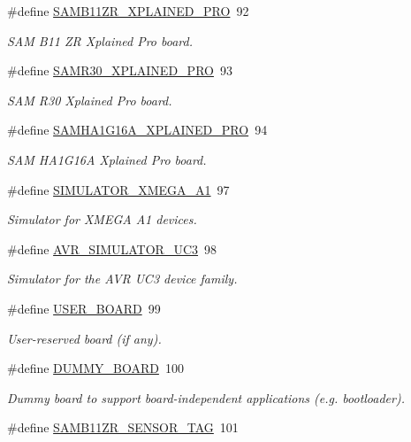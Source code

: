 \begin{DoxyCompactItemize}
\#define \mbox{\hyperlink{group__group__common__boards_ga2d39842a107a4167ecb83defbf24e7c2}{S\+A\+M\+B11\+Z\+R\+\_\+\+X\+P\+L\+A\+I\+N\+E\+D\+\_\+\+P\+RO}}~92
\begin{DoxyCompactList}\small\item\em S\+AM B11 ZR Xplained Pro board. \end{DoxyCompactList}\item 
\#define \mbox{\hyperlink{group__group__common__boards_ga2b7f84db63d05656cea0ad59e796c108}{S\+A\+M\+R30\+\_\+\+X\+P\+L\+A\+I\+N\+E\+D\+\_\+\+P\+RO}}~93
\begin{DoxyCompactList}\small\item\em S\+AM R30 Xplained Pro board. \end{DoxyCompactList}\item 
\#define \mbox{\hyperlink{group__group__common__boards_ga0752b49586742861982f51843b2ac76b}{S\+A\+M\+H\+A1\+G16\+A\+\_\+\+X\+P\+L\+A\+I\+N\+E\+D\+\_\+\+P\+RO}}~94
\begin{DoxyCompactList}\small\item\em S\+AM H\+A1\+G16A Xplained Pro board. \end{DoxyCompactList}\item 
\#define \mbox{\hyperlink{group__group__common__boards_ga1c9dfe8403ed817c13fc6031956b1635}{S\+I\+M\+U\+L\+A\+T\+O\+R\+\_\+\+X\+M\+E\+G\+A\+\_\+\+A1}}~97
\begin{DoxyCompactList}\small\item\em Simulator for X\+M\+E\+GA A1 devices. \end{DoxyCompactList}\item 
\#define \mbox{\hyperlink{group__group__common__boards_gad93cf08d9dfb95c3c2cfd1cf38c0f2e4}{A\+V\+R\+\_\+\+S\+I\+M\+U\+L\+A\+T\+O\+R\+\_\+\+U\+C3}}~98
\begin{DoxyCompactList}\small\item\em Simulator for the A\+VR U\+C3 device family. \end{DoxyCompactList}\item 
\#define \mbox{\hyperlink{group__group__common__boards_ga6e6dffe821337dbaaa12bca06e8e5119}{U\+S\+E\+R\+\_\+\+B\+O\+A\+RD}}~99
\begin{DoxyCompactList}\small\item\em User-\/reserved board (if any). \end{DoxyCompactList}\item 
\#define \mbox{\hyperlink{group__group__common__boards_gac33d75ae101690822610338fdff2e95b}{D\+U\+M\+M\+Y\+\_\+\+B\+O\+A\+RD}}~100
\begin{DoxyCompactList}\small\item\em Dummy board to support board-\/independent applications (e.\+g. bootloader). \end{DoxyCompactList}\item 
\#define \mbox{\hyperlink{group__group__common__boards_gad53e4f37c1ce0bcdcd6c9fabea32d864}{S\+A\+M\+B11\+Z\+R\+\_\+\+S\+E\+N\+S\+O\+R\+\_\+\+T\+AG}}~101
\end{DoxyCompactItemize}
